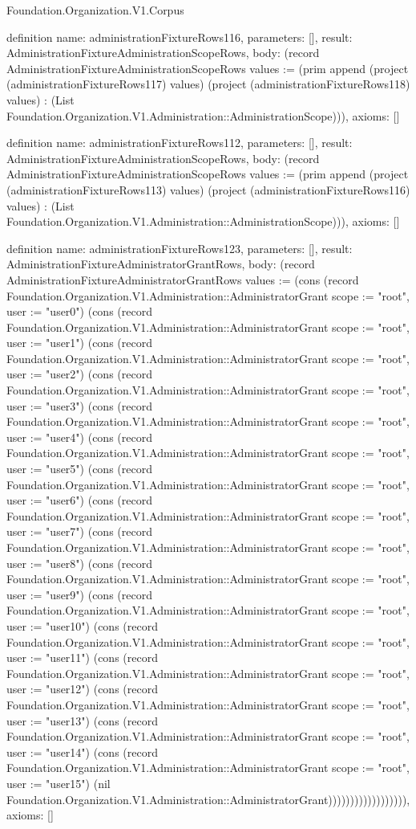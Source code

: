 \begin{lexlean}{Foundation.Organization.V1.Corpus}
\begin{semanticmodule}
definition{
  name: administrationFixtureRows116,
  parameters: [],
  result: AdministrationFixtureAdministrationScopeRows,
  body: (record AdministrationFixtureAdministrationScopeRows {values := (prim append (project (administrationFixtureRows117) values) (project (administrationFixtureRows118) values) : (List Foundation.Organization.V1.Administration::AdministrationScope))}),
  axioms: []
}

definition{
  name: administrationFixtureRows112,
  parameters: [],
  result: AdministrationFixtureAdministrationScopeRows,
  body: (record AdministrationFixtureAdministrationScopeRows {values := (prim append (project (administrationFixtureRows113) values) (project (administrationFixtureRows116) values) : (List Foundation.Organization.V1.Administration::AdministrationScope))}),
  axioms: []
}

definition{
  name: administrationFixtureRows123,
  parameters: [],
  result: AdministrationFixtureAdministratorGrantRows,
  body: (record AdministrationFixtureAdministratorGrantRows {values := (cons (record Foundation.Organization.V1.Administration::AdministratorGrant {scope := "root", user := "user0"}) (cons (record Foundation.Organization.V1.Administration::AdministratorGrant {scope := "root", user := "user1"}) (cons (record Foundation.Organization.V1.Administration::AdministratorGrant {scope := "root", user := "user2"}) (cons (record Foundation.Organization.V1.Administration::AdministratorGrant {scope := "root", user := "user3"}) (cons (record Foundation.Organization.V1.Administration::AdministratorGrant {scope := "root", user := "user4"}) (cons (record Foundation.Organization.V1.Administration::AdministratorGrant {scope := "root", user := "user5"}) (cons (record Foundation.Organization.V1.Administration::AdministratorGrant {scope := "root", user := "user6"}) (cons (record Foundation.Organization.V1.Administration::AdministratorGrant {scope := "root", user := "user7"}) (cons (record Foundation.Organization.V1.Administration::AdministratorGrant {scope := "root", user := "user8"}) (cons (record Foundation.Organization.V1.Administration::AdministratorGrant {scope := "root", user := "user9"}) (cons (record Foundation.Organization.V1.Administration::AdministratorGrant {scope := "root", user := "user10"}) (cons (record Foundation.Organization.V1.Administration::AdministratorGrant {scope := "root", user := "user11"}) (cons (record Foundation.Organization.V1.Administration::AdministratorGrant {scope := "root", user := "user12"}) (cons (record Foundation.Organization.V1.Administration::AdministratorGrant {scope := "root", user := "user13"}) (cons (record Foundation.Organization.V1.Administration::AdministratorGrant {scope := "root", user := "user14"}) (cons (record Foundation.Organization.V1.Administration::AdministratorGrant {scope := "root", user := "user15"}) (nil Foundation.Organization.V1.Administration::AdministratorGrant)))))))))))))))))}),
  axioms: []
}


\end{semanticmodule}
\end{lexlean}
